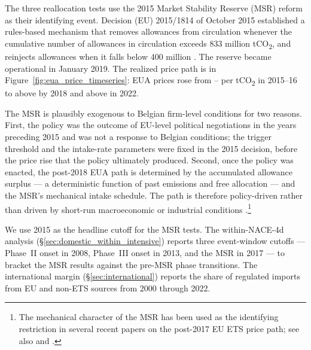 The three reallocation tests use the 2015 Market Stability Reserve (MSR) reform as their identifying event. Decision (EU) 2015/1814 of October 2015 established a rules-based mechanism that removes allowances from circulation whenever the cumulative number of allowances in circulation exceeds 833 million tCO\textsubscript{2}, and reinjects allowances when it falls below 400 million \citep{Perino2018}. The reserve became operational in January 2019. The realized price path is in Figure~\ref{fig:eua_price_timeseries}: EUA prices rose from -- per tCO\textsubscript{2} in 2015--16 to above  by 2018 and above  in 2022.

The MSR is plausibly exogenous to Belgian firm-level conditions for two reasons. First, the policy was the outcome of EU-level political negotiations in the years preceding 2015 and was not a response to Belgian conditions; the trigger threshold and the intake-rate parameters were fixed in the 2015 decision, before the price rise that the policy ultimately produced. Second, once the policy was enacted, the post-2018 EUA path is determined by the accumulated allowance surplus --- a deterministic function of past emissions and free allocation --- and the MSR's mechanical intake schedule. The path is therefore policy-driven rather than driven by short-run macroeconomic or industrial conditions \citep{dejhonge2020}.\footnote{The mechanical character of the MSR has been used as the identifying restriction in several recent papers on the post-2017 EU ETS price path; see also \citet{kanzig2023unequal} and \citet{BauerKaenzigRudebusch2026}.}

We use 2015 as the headline cutoff for the MSR tests. The within-NACE-4d analysis (\S\ref{sec:domestic_within_intensive}) reports three event-window cutoffs --- Phase~II onset in 2008, Phase~III onset in 2013, and the MSR in 2017 --- to bracket the MSR results against the pre-MSR phase transitions. The international margin (\S\ref{sec:international}) reports the share of regulated imports from EU and non-ETS sources from 2000 through 2022.
